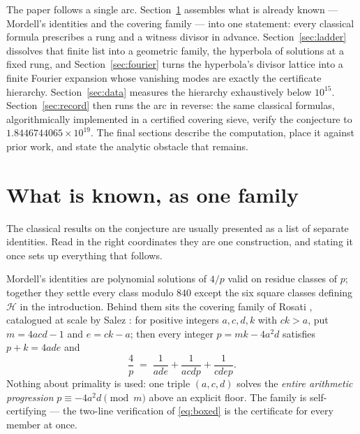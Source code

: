 \documentclass[11pt]{article}
\theoremstyle{definition}
\theoremstyle{remark}
\begin{document}
The paper follows a single arc. Section~\ref{sec:known} assembles what is already
known --- Mordell's identities and the covering family --- into one statement: every
classical formula prescribes a rung and a witness divisor in advance.
Section~\ref{sec:ladder} dissolves that finite list into a geometric family, the
hyperbola of solutions at a fixed rung, and Section~\ref{sec:fourier} turns the
hyperbola's divisor lattice into a finite Fourier expansion whose vanishing modes are
exactly the certificate hierarchy. Section~\ref{sec:data} measures the hierarchy
exhaustively below $10^{15}$. Section~\ref{sec:record} then runs the arc in reverse:
the same classical formulas, algorithmically implemented in a certified covering sieve, verify
the conjecture to $1.8446744065\times10^{19}$. The final sections describe the
computation, place it against prior work, and state the analytic obstacle that remains.

\section{What is known, as one family}\label{sec:known}

The classical results on the conjecture are usually presented as a list of separate
identities. Read in the right coordinates they are one construction, and stating it
once sets up everything that follows.

Mordell's identities \cite{Mordell1969} are polynomial solutions of $4/p$ valid on
residue classes of $p$; together they settle every class modulo $840$ except the six
square classes defining $\mathcal H$ in the introduction. Behind them sits the covering family
of Rosati \cite{Rosati1954}, catalogued at scale by Salez \cite{Salez2014}: for
positive integers $a, c, d, k$ with $ck > a$, put $m = 4acd - 1$ and $e = ck - a$;
then every integer $p = mk - 4a^2d$ satisfies $p + k = 4ade$ and
\begin{equation}\label{eq:boxed}
\frac{4}{p} \;=\; \frac{1}{ade} + \frac{1}{acdp} + \frac{1}{cdep}.
\end{equation}
Nothing about primality is used: one triple $(a,c,d)$ solves the \emph{entire
arithmetic progression} $p \equiv -4a^2d \pmod m$ above an explicit floor. The family
is self-certifying --- the two-line verification of \eqref{eq:boxed} is the
certificate for every member at once.
\end{document}
